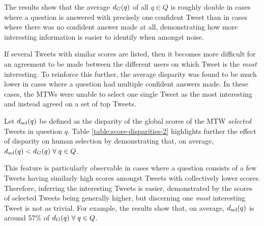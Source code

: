 The results show that the average $d_G(q)$ of all $q \in Q$ is roughly double in cases where a question is answered with precisely one confident Tweet than in cases where there was no confident answer made at all, demonstrating how more interesting information is easier to identify when amongst noise. 

If several Tweets with similar scores are listed, then it becomes more difficult for an agreement to be made between the different users on which Tweet is the \textit{most} interesting. To reinforce this further, the average disparity was found to be much lower in cases where a question had multiple confident answers made. In these cases, the MTWs were unable to select one single Tweet as the most interesting and instead agreed on a set of top Tweets.


Let $d_{\textrm{sel}}(q)$ be defined as the disparity of the global scores of the MTW \textit{selected} Tweets in question $q$. Table \ref{table:score-disparities-2} highlights further the effect of disparity on human selection by demonstrating that, on average, $d_{\textrm{sel}}(q) < d_G(q) \; \forall \; q \in Q$. 


This feature is particularly observable in cases where a question consists of a few Tweets having similarly high scores amongst Tweets with collectively lower scores. Therefore, inferring the interesting Tweets is easier, demonstrated by the scores of selected Tweets being generally higher, but discerning one \textit{most} interesting Tweet is not as trivial. For example, the results show that, on average, $d_{\textrm{sel}}(q)$ is around 57\% of $d_G(q) \; \forall \; q \in Q$.

